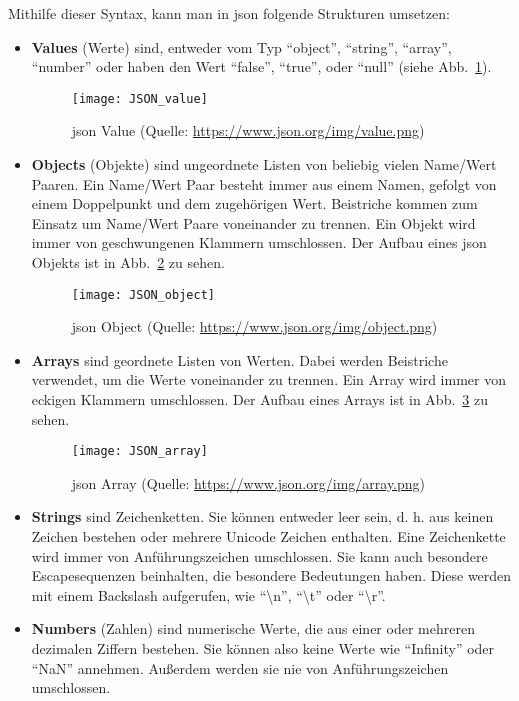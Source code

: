 Mithilfe dieser Syntax, kann man in \acs{json} folgende Strukturen umsetzen:
\begin{itemize}
	\item \textbf{Values} (\dt Werte) sind, entweder vom Typ \enquote{object}, \enquote{string}, \enquote{array}, \enquote{number} oder haben den Wert \enquote{false}, \enquote{true}, oder \enquote{null} (siehe Abb.~\ref{fig:json_value}).
	\begin{figure}[H]
		\centering
		\texttt{[image: JSON\_value]}
		\caption{\acs{json} Value (Quelle: \url{https://www.json.org/img/value.png})  \label{fig:json_value}}
	\end{figure}
	
	\item \textbf{Objects} (\dt Objekte) sind ungeordnete Listen von beliebig vielen Name/Wert Paaren. Ein Name/Wert Paar besteht immer aus einem Namen, gefolgt von einem Doppelpunkt und dem zugehörigen Wert. Beistriche kommen zum Einsatz um Name/Wert Paare voneinander zu trennen. Ein Objekt wird immer von geschwungenen Klammern umschlossen. Der Aufbau eines \acs{json} Objekts ist in Abb.~\ref{fig:json_object} zu sehen.
	
	\begin{figure}[H]
		\centering
		\texttt{[image: JSON\_object]}
		\caption{\acs{json} Object (Quelle: \url{https://www.json.org/img/object.png})  \label{fig:json_object}}
	\end{figure}
	
	\item \textbf{Arrays} sind geordnete Listen von Werten. Dabei werden Beistriche verwendet, um die Werte voneinander zu trennen. Ein Array wird immer von eckigen Klammern umschlossen. Der Aufbau eines Arrays ist in Abb.~\ref{fig:json_array} zu sehen.
	
	\begin{figure}[H]
		\centering
		\texttt{[image: JSON\_array]}
		\caption{\acs{json} Array (Quelle: \url{https://www.json.org/img/array.png})  \label{fig:json_array}}
	\end{figure}
	
	\item \textbf{Strings} sind Zeichenketten. Sie können entweder leer sein, d. h. aus keinen Zeichen bestehen oder mehrere Unicode Zeichen enthalten. Eine Zeichenkette wird immer von Anführungszeichen umschlossen. Sie kann auch besondere Escapesequenzen beinhalten, die besondere Bedeutungen haben. Diese werden mit einem Backslash aufgerufen, wie \zB \enquote{\textbackslash n}, \enquote{\textbackslash t} oder \enquote{\textbackslash r}.
	
	\item \textbf{Numbers} (\dt Zahlen) sind numerische Werte, die aus einer oder mehreren dezimalen Ziffern bestehen. Sie können also keine Werte wie \zB \enquote{Infinity} oder \enquote{NaN} annehmen. Außerdem werden sie nie von Anführungszeichen umschlossen. 
	
\end{itemize}

